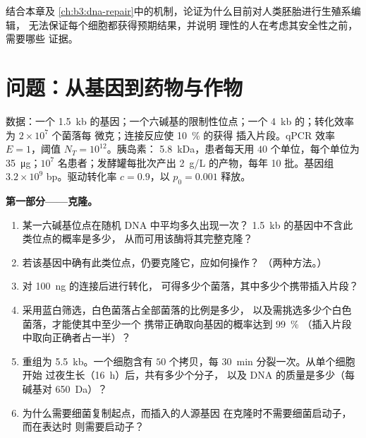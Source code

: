 \begin{exercise}[$\star\star\star$]\label{exo:b3:genetic-engineering:12}
结合本章及
\cref{ch:b3:dna-repair}中的机制，论证为什么目前对人类胚胎进行生殖系编辑，
无法保证每个细胞都获得预期结果，并说明
理性的人在考虑其安全性之前，需要哪些
证据。
\end{exercise}

\section{问题：从基因到药物与作物}

\begin{problem}
\label{pb:b3:genetic-engineering:1}
数据：一个 \qty{1.5}{kb} 的基因；一个六碱基的限制性位点；一个
\qty{4}{kb} 的；转化效率为 $2\times 10^{7}$ 个菌落每
微克；连接反应使 \qty{10}{\%} 的获得
插入片段。qPCR 效率 $E = 1$，阈值 $N_{T} = 10^{12}$。胰岛素：
\qty{5.8}{kDa}，患者每天用 $40$ 个单位，每个单位为
\qty{35}{\micro g}；$10^{7}$ 名患者；发酵罐每批次产出
\qty{2}{g/L} 的产物，每年 10 批。基因组 $3.2\times
10^{9}$ bp。驱动转化率 $c = 0.9$，以 $p_{0} = 0.001$ 释放。

\medskip
\noindent\textbf{第一部分——克隆。}
\begin{enumerate}
  \item 某一六碱基位点在随机 DNA 中平均多久出现一次？
        \qty{1.5}{kb} 的基因中不含此类位点的概率是多少，
        从而可用该酶将其完整克隆？
  \item 若该基因中确有此类位点，仍要克隆它，应如何操作？
        （两种方法。）
  \item 对 \qty{100}{ng} 的连接后进行转化，
        可得多少个菌落，其中多少个携带插入片段？
  \item 采用蓝白筛选，白色菌落占全部菌落的比例是多少，
        以及需挑选多少个白色菌落，才能使其中至少一个
        携带正确取向基因的概率达到 \qty{99}{\%}
        （插入片段中取向正确者占一半）？
  \item 重组为 \qty{5.5}{kb}。一个细胞含有 $50$
        个拷贝，每 \qty{30}{min} 分裂一次。从单个细胞开始
        过夜生长（\qty{16}{h}）后，共有多少个分子，
        以及 DNA 的质量是多少（每碱基对 \qty{650}{Da}）？
  \item 为什么需要细菌复制起点，而插入的人源基因
        在克隆时不需要细菌启动子，而在表达时
        则需要启动子？
\end{enumerate}


\end{problem}
